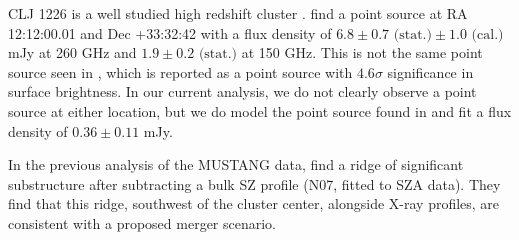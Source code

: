 
CLJ 1226 is a well studied high redshift cluster \citep[e.g.][]{mroczkowski2009,bulbul2010,adam2015}. 
\citet{adam2015} find a point source at RA 12:12:00.01 and Dec +33:32:42 with a flux density of 
$6.8 \pm 0.7 \text{ (stat.)} \pm 1.0 \text{ (cal.)}$ mJy at 260 GHz and $1.9 \pm 0.2 \text{ (stat.)}$ at 150 GHz. 
This is not the same point source seen in \citet{korngut2011}, which is reported as a point source
with $4.6\sigma$ significance in surface brightness. In our current analysis, we do not clearly observe a point
source at either location, but we do model the point source found in \citet{adam2015} and fit a flux density of
$0.36 \pm 0.11$ mJy.

In the previous analysis of the MUSTANG data, \citet{korngut2011} find a ridge of significant substructure after 
subtracting a bulk SZ profile (N07, fitted to SZA data). They find that this ridge, southwest of the cluster
center, alongside X-ray profiles, are consistent with a proposed merger scenario.

